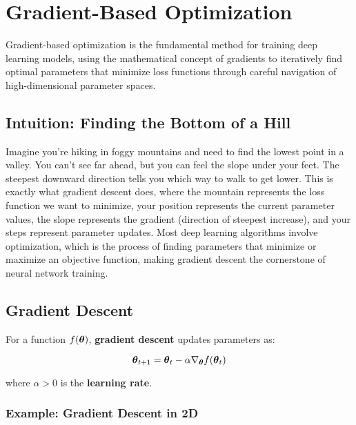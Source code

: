 
\section{Gradient-Based Optimization }
\label{sec:gradient-optimization}

Gradient-based optimization is the fundamental method for training deep learning models, using the mathematical concept of gradients to iteratively find optimal parameters that minimize loss functions through careful navigation of high-dimensional parameter spaces.

\subsection{Intuition: Finding the Bottom of a Hill}

Imagine you're hiking in foggy mountains and need to find the lowest point in a valley. You can't see far ahead, but you can feel the slope under your feet. The steepest downward direction tells you which way to walk to get lower. This is exactly what gradient descent does, where the mountain represents the loss function we want to minimize, your position represents the current parameter values, the slope represents the gradient (direction of steepest increase), and your steps represent parameter updates. Most deep learning algorithms involve optimization, which is the process of finding parameters that minimize or maximize an objective function, making gradient descent the cornerstone of neural network training.

\subsection{Gradient Descent}

For a function $f(\boldsymbol{\theta})$, \textbf{gradient descent} updates parameters as:

\begin{equation}
\boldsymbol{\theta}_{t+1} = \boldsymbol{\theta}_t - \alpha \nabla_{\boldsymbol{\theta}} f(\boldsymbol{\theta}_t)
\end{equation}

where $\alpha > 0$ is the \textbf{learning rate}.

\subsubsection{Example: Gradient Descent in 2D}

